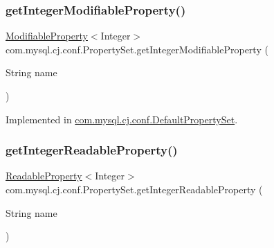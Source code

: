 \mbox{\label{interfacecom_1_1mysql_1_1cj_1_1conf_1_1_property_set_a23c7b32f5aa0b61cd6b23ae0a712673b}} 
\subsubsection{\texorpdfstring{get\+Integer\+Modifiable\+Property()}{getIntegerModifiableProperty()}}
{\footnotesize\ttfamily \mbox{\hyperlink{interfacecom_1_1mysql_1_1cj_1_1conf_1_1_modifiable_property}{Modifiable\+Property}}$<$Integer$>$ com.\+mysql.\+cj.\+conf.\+Property\+Set.\+get\+Integer\+Modifiable\+Property (\begin{DoxyParamCaption}\item[{String}]{name }\end{DoxyParamCaption})}



Implemented in \mbox{\hyperlink{classcom_1_1mysql_1_1cj_1_1conf_1_1_default_property_set_a24f6c3107ffad2e900facd8f89f91029}{com.\+mysql.\+cj.\+conf.\+Default\+Property\+Set}}.

\mbox{\label{interfacecom_1_1mysql_1_1cj_1_1conf_1_1_property_set_a95fdeed14f959c79664ea5814608c17b}} 
\subsubsection{\texorpdfstring{get\+Integer\+Readable\+Property()}{getIntegerReadableProperty()}}
{\footnotesize\ttfamily \mbox{\hyperlink{interfacecom_1_1mysql_1_1cj_1_1conf_1_1_readable_property}{Readable\+Property}}$<$Integer$>$ com.\+mysql.\+cj.\+conf.\+Property\+Set.\+get\+Integer\+Readable\+Property (\begin{DoxyParamCaption}\item[{String}]{name }\end{DoxyParamCaption})}



